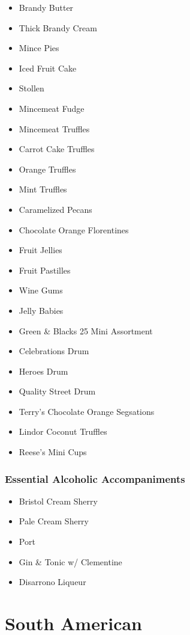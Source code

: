 \documentclass[11pt, english]{article}
\begin{document}
	\begin{itemize}
	\setlength\itemsep{0cm}
		\item Brandy Butter
		\item Thick Brandy Cream
		\item Mince Pies
		\item Iced Fruit Cake
		\item Stollen
		\item Mincemeat Fudge
		\item Mincemeat Truffles
		\item Carrot Cake Truffles
		\item Orange Truffles
		\item Mint Truffles
		\item Caramelized Pecans
		\item Chocolate Orange Florentines
		\item Fruit Jellies
		\item Fruit Pastilles
		\item Wine Gums
		\item Jelly Babies
		\item Green \& Blacks 25 Mini Assortment
		\item Celebrations Drum
		\item Heroes Drum
		\item Quality Street Drum
		\item Terry's Chocolate Orange Segsations
		\item Lindor Coconut Truffles
		\item Reese's Mini Cups
	\end{itemize}

		\subsubsection*{Essential Alcoholic Accompaniments}

	\begin{itemize}
        \setlength\itemsep{0cm}
		\item Bristol Cream Sherry
		\item Pale Cream Sherry
		\item Port
		\item Gin \& Tonic w/ Clementine
		\item Disarrono Liqueur
	\end{itemize}

\newpage

\section{South American}
\end{document}
